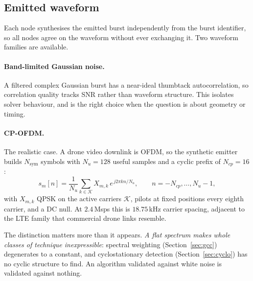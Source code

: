 \documentclass[11pt,a4paper]{article}
\begin{document}
\subsection{Emitted waveform}

Each node synthesises the emitted burst independently from the burst
identifier, so all nodes agree on the waveform without ever exchanging it.
Two waveform families are available.

\paragraph{Band-limited Gaussian noise.} A filtered complex Gaussian burst
has a near-ideal thumbtack autocorrelation, so correlation quality tracks
SNR rather than waveform structure. This isolates solver behaviour, and is
the right choice when the question is about geometry or timing.

\paragraph{CP-OFDM.} The realistic case. A drone video downlink is OFDM, so
the synthetic emitter builds $N_{\text{sym}}$ symbols with $N_u=128$ useful
samples and a cyclic prefix of $N_{cp}=16$:
\begin{equation}
  s_m[n] = \frac{1}{N_u}\sum_{k\in\mathcal{K}} X_{m,k}\,
           e^{\,j2\pi kn/N_u},\qquad n=-N_{cp},\dots,N_u-1,
\end{equation}
with $X_{m,k}$ QPSK on the active carriers $\mathcal{K}$, pilots at fixed
positions every eighth carrier, and a DC null. At $2.4$\,Msps this is
$18.75$\,kHz carrier spacing, adjacent to the LTE family that commercial
drone links resemble.

The distinction matters more than it appears. \emph{A flat spectrum makes
whole classes of technique inexpressible}: spectral weighting
(Section~\ref{sec:gcc}) degenerates to a constant, and cyclostationary
detection (Section~\ref{sec:cyclo}) has no cyclic structure to find. An
algorithm validated against white noise is validated against nothing.
\end{document}
